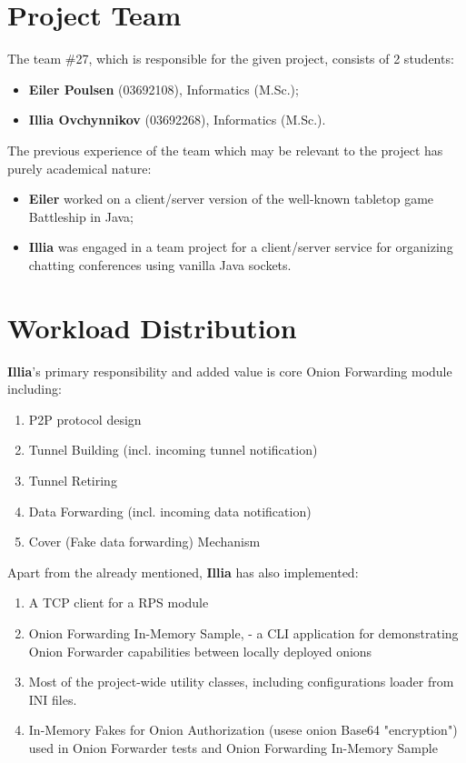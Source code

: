 \documentclass{article}
\begin{document}
\section{Project Team}
The team \#27, which is responsible for the given project, consists of 2 students:

\begin{itemize}
\item \textbf{Eiler Poulsen} (03692108), Informatics (M.Sc.);
\item \textbf{Illia Ovchynnikov} (03692268), Informatics (M.Sc.).
\end{itemize}

The previous experience of the team which may be relevant to the project has purely academical nature:

\begin{itemize}
\item \textbf{Eiler} worked on a client/server version of the well-known tabletop game Battleship in Java;
\item \textbf{Illia} was engaged in a team project for a client/server service for organizing chatting conferences using vanilla Java sockets.
\end{itemize}

\section{Workload Distribution}
\textbf{Illia}'s primary responsibility and added value is core Onion Forwarding module including:
\begin{enumerate}
  \item P2P protocol design
  \item Tunnel Building (incl. incoming tunnel notification)
  \item Tunnel Retiring
  \item Data Forwarding (incl. incoming data notification)
  \item Cover (Fake data forwarding) Mechanism
\end{enumerate}

Apart from the already mentioned, \textbf{Illia} has also implemented:
\begin{enumerate}
  \item A TCP client for a RPS module
  \item Onion Forwarding In-Memory Sample, - a CLI application for demonstrating Onion Forwarder capabilities between locally deployed onions
  \item Most of the project-wide utility classes, including configurations loader from INI files.
  \item In-Memory Fakes for Onion Authorization (usese onion Base64 "encryption") used in Onion Forwarder tests and Onion Forwarding In-Memory Sample
\end{enumerate}
\end{document}
